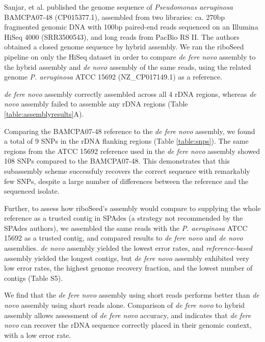 \documentclass[a4,center,fleqn]{NAR}
\begin{document}
Sanjar, et al. published the genome sequence of \textit{Pseudomonas aeruginosa} BAMCPA07-48 (CP015377.1)\cite{Sanjar2016}, assembled from two libraries: ca. 270bp fragmented genomic DNA with 100bp paired-end reads sequenced on an Illumina HiSeq 4000 (SRR3500543), and long reads from PacBio RS II. The authors obtained a closed genome sequence by hybrid assembly. We ran the riboSeed pipeline on only the HiSeq dataset in order to compare \textit{de fere novo} assembly to the hybrid assembly and \textit{de novo} assembly of the same reads, using the related genome \textit{P. aeruginosa} ATCC 15692 (NZ\_CP017149.1) as a reference.

\textit{de fere novo} assembly correctly assembled across all 4 rDNA regions, whereas \textit{de novo} assembly failed to assemble any rDNA regions (Table \ref{table:assemblyresults}A).

Comparing the BAMCPA07-48 reference to the \textit{de fere novo} assembly, we found a total of 9 SNPs in the rDNA flanking regions (Table \ref{table:snps}). The same regions from the ATCC 15692 reference used in the \textit{de fere novo} assembly showed 108 SNPs compared to the BAMCPA07-48.  This demonstrates that this subassembly scheme successfuly recovers the correct sequence with remarkably few SNPs, despite a large number of differences between the reference and the sequenced isolate.

Further, to assess how riboSeed's assembly would compare to supplying the whole reference as a trusted contig in SPAdes (a strategy not recommended by the SPAdes authors), we assembled the same reads with the \textit{P. aeruginosa} ATCC 15692 as a trusted contig, and compared results to \textit{de fere novo} and \textit{de novo} assemblies. \textit{de novo} assembly yielded the lowest error rates, and \textit{reference-based}  assembly yielded the longest contigs, but \textit{de fere novo} assembly exhibited very low error rates, the highest genome recovery fraction, and the lowest number of contigs (Table S5).


We find that the \textit{de fere novo} assembly using short reads performs better than \textit{de novo} assembly using short reads alone. Comparison of \textit{de fere novo} to hybrid assembly allows assessment of \textit{de fere novo} accuracy, and indicates that \textit{de fere novo} can recover the rDNA sequence correctly placed in their genomic context, with a low error rate.
\end{document}
